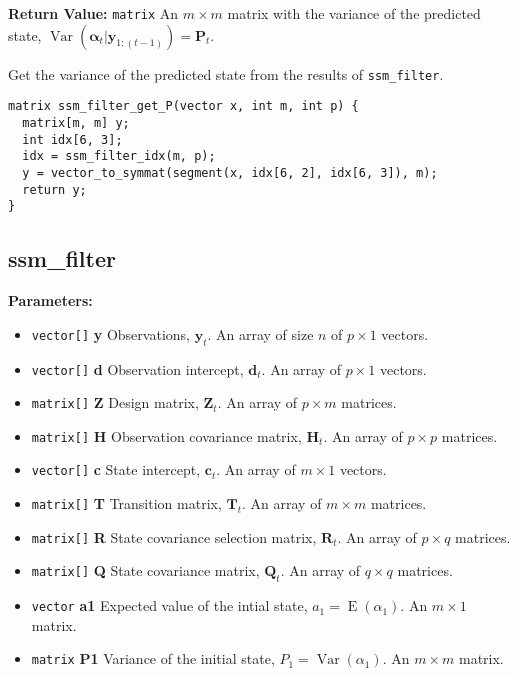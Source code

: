 \documentclass[]{book}
\providecommand{\tightlist}{%
  \setlength{\itemsep}{0pt}\setlength{\parskip}{0pt}}
\DeclareMathOperator{\E}{E}
\DeclareMathOperator{\Var}{Var}
\newcommand{\mat}[1]{\boldsymbol{#1}}
\renewcommand{\vec}[1]{\boldsymbol{#1}}
\begin{document}
\textbf{Return Value:} \texttt{matrix} An \(m \times m\) matrix with the
variance of the predicted state,
\(\Var(\vec{\alpha}_t | \vec{y}_{1:(t-1)}) = \mat{P}_t\).

Get the variance of the predicted state from the results of
\texttt{ssm\_filter}.

\begin{verbatim}
matrix ssm_filter_get_P(vector x, int m, int p) {
  matrix[m, m] y;
  int idx[6, 3];
  idx = ssm_filter_idx(m, p);
  y = vector_to_symmat(segment(x, idx[6, 2], idx[6, 3]), m);
  return y;
}
\end{verbatim}

\subsection{ssm\_filter}\label{ssmux5ffilter}

\textbf{Parameters:}

\begin{itemize}
\tightlist
\item
  \texttt{vector{[}{]}} \textbf{y} Observations, \(\vec{y}_t\). An array
  of size \(n\) of \(p \times 1\) vectors.
\item
  \texttt{vector{[}{]}} \textbf{d} Observation intercept, \(\vec{d}_t\).
  An array of \(p \times 1\) vectors.
\item
  \texttt{matrix{[}{]}} \textbf{Z} Design matrix, \(\mat{Z}_t\). An
  array of \(p \times m\) matrices.
\item
  \texttt{matrix{[}{]}} \textbf{H} Observation covariance matrix,
  \(\mat{H}_t\). An array of \(p \times p\) matrices.
\item
  \texttt{vector{[}{]}} \textbf{c} State intercept, \(\vec{c}_t\). An
  array of \(m \times 1\) vectors.
\item
  \texttt{matrix{[}{]}} \textbf{T} Transition matrix, \(\mat{T}_t\). An
  array of \(m \times m\) matrices.
\item
  \texttt{matrix{[}{]}} \textbf{R} State covariance selection matrix,
  \(\mat{R} _t\). An array of \(p \times q\) matrices.
\item
  \texttt{matrix{[}{]}} \textbf{Q} State covariance matrix,
  \(\mat{Q}_t\). An array of \(q \times q\) matrices.
\item
  \texttt{vector} \textbf{a1} Expected value of the intial state,
  \(a_1 = \E(\alpha_1)\). An \(m \times 1\) matrix.
\item
  \texttt{matrix} \textbf{P1} Variance of the initial state,
  \(P_1 = \Var(\alpha_1)\). An \(m \times m\) matrix.
\end{itemize}
\end{document}
